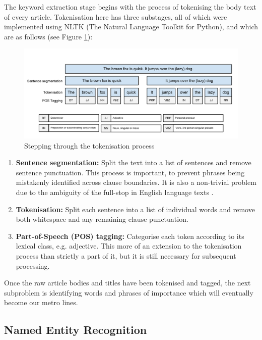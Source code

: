 The keyword extraction stage begins with the process of tokenising the body text of every article. Tokenisation here has three substages, all of which were implemented using NLTK (The Natural Language Toolkit for Python), and which are as follows (see Figure \ref{fig:tokenisation}):
\begin{figure}[htbp!]
	\centering
	\includegraphics[width=\textwidth]{img/implementation/Tokenisation.pdf}
	\caption{Stepping through the tokenisation process}
	\label{fig:tokenisation}
\end{figure}
\begin{enumerate}[itemsep=0.1em]
	\item\textbf{Sentence segmentation:} Split the text into a list of sentences and remove sentence punctuation. This process is important, to prevent phrases being mistakenly identified across clause boundaries. It is also a non-trivial problem due to the ambiguity of the full-stop in English language texts \citep{TokenisationAndSentenceSegmentation}.
	\item\textbf{Tokenisation:} Split each sentence into a list of individual words and remove both whitespace and any remaining clause punctuation.
	\item\textbf{Part-of-Speech (POS) tagging:} Categorise each token according to its lexical class, e.g. adjective. This more of an extension to the tokenisation process than strictly a part of it, but it is still necessary for subsequent processing.
\end{enumerate}

Once the raw article bodies and titles have been tokenised and tagged, the next subproblem is identifying words and phrases of importance which will eventually become our metro lines.

\subsection{Named Entity Recognition}

